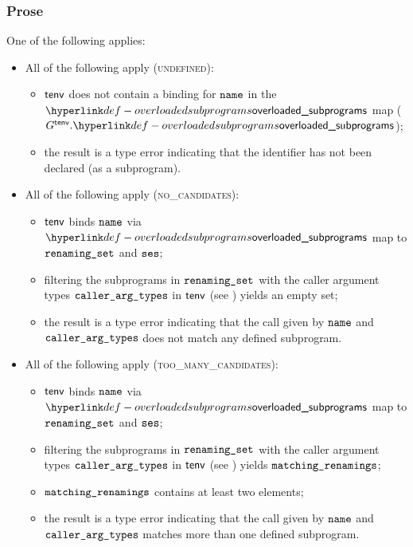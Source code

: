 \subsubsection{Prose}
One of the following applies:
\begin{itemize}
  \item All of the following apply (\textsc{undefined}):
  \begin{itemize}
    \item $\textsf{tenv}$ does not contain a binding for $\texttt{name}$ in the $\overloadedsubprograms$ map
          ($G^\tenv.\overloadedsubprograms$);
    \item the result is a type error indicating that the identifier has not been declared (as a subprogram).
  \end{itemize}

  \item All of the following apply (\textsc{no\_candidates}):
  \begin{itemize}
    \item $\textsf{tenv}$ binds $\texttt{name}$ via $\overloadedsubprograms$ map to $\texttt{renaming\_set}$ and $\texttt{ses}$;
    \item filtering the subprograms in $\texttt{renaming\_set}$ with the caller argument types $\texttt{caller\_arg\_types}$
          in $\textsf{tenv}$ (see ) yields an empty set\ProseOrTypeError;
    \item the result is a type error indicating that the call given by $\texttt{name}$ and \\ $\texttt{caller\_arg\_types}$
          does not match any defined subprogram.
  \end{itemize}

  \item All of the following apply (\textsc{too\_many\_candidates}):
  \begin{itemize}
    \item $\textsf{tenv}$ binds $\texttt{name}$ via $\overloadedsubprograms$ map to $\texttt{renaming\_set}$ and $\texttt{ses}$;
    \item filtering the subprograms in $\texttt{renaming\_set}$ with the caller argument types $\texttt{caller\_arg\_types}$
          in $\textsf{tenv}$ (see ) yields $\texttt{matching\_renamings}$\ProseOrTypeError;
    \item $\texttt{matching\_renamings}$ contains at least two elements;
    \item the result is a type error indicating that the call given by $\texttt{name}$ and \\
          $\texttt{caller\_arg\_types}$ matches more than one defined subprogram.
  \end{itemize}


\end{itemize}
